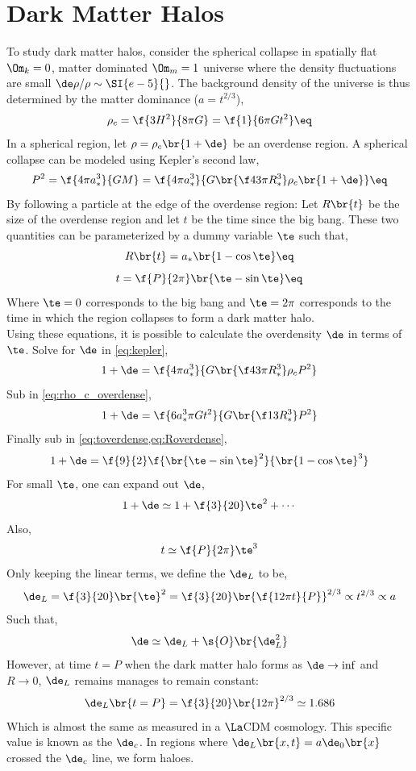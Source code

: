 \documentclass{article}
\begin{document}
\section{Dark Matter Halos}
To study dark matter halos, consider the spherical collapse in spatially flat $\Om_k = 0$, matter dominated $\Om_m = 1$ universe where the density fluctuations are small $\de \rho / \rho \sim \SI{e-5}{}$. The background density of the universe is thus determined by the matter dominance ($a = t^{2/3}$),
\[ \rho_c = \f{3 H^2}{8 \pi G} = \f{1}{6 \pi G t^2} \eq \label{eq:rho_c_overdense}\]
In a spherical region, let $\rho = \rho_c \br{1 + \de}$ be an overdense region. A spherical collapse can be modeled using Kepler's second law,
\[ P^2  = \f{4 \pi a_{*}^3}{GM} = \f{4 \pi a_{*}^3}{G \br{\f43 \pi R_{*}^3} \rho_{c}\br{1 + \de}} \eq \label{eq:kepler} \]
By following a particle at the edge of the overdense region: Let $R\br{t}$ be the size of the overdense region and let $t$ be the time since the big bang. These two quantities can be parameterized by a dummy variable $\te$ such that,
\[ R\br{t} = a_{*}\br{1  - \cos \te} \eq \label{eq:Roverdense}\]
\[ t = \f{P}{2 \pi}\br{\te - \sin \te} \eq \label{eq:toverdense}\]
Where $\te = 0$ corresponds to the big bang and $\te = 2\pi$ corresponds to the time in which the region collapses to form a dark matter halo.\\
Using these equations, it is possible to calculate the overdensity $\de$ in terms of $\te$. Solve for $\de$ in \cref{eq:kepler},
\[ 1 + \de = \f{4 \pi a_{*}^3}{G \br{\f43 \pi R_{*}^3} \rho_{c} P^2} \]
Sub in \cref{eq:rho_c_overdense},
\[ 1 + \de = \f{ 6 a_{*}^3 \pi G t^2}{G \br{\f13 R_{*}^3} P^2} \]
Finally sub in \cref{eq:toverdense,eq:Roverdense},
\[ 1 + \de = \f{9}{2}\f{\br{\te - \sin \te}^2}{\br{1 - \cos \te}^3} \]
For small $\te$, one can expand out $\de$,
\[ 1 + \de  \simeq 1 + \f{3}{20} \te^2 + \cdots \]
Also,
\[ t \simeq \f{P}{2 \pi} \te^3 \]
Only keeping the linear terms, we define the  $\de_L$ to be,
\[ \de_{L} = \f{3}{20} \br{\te}^2 = \f{3}{20} \br{\f{12 \pi t}{P}}^{2/3} \propto t^{2/3} \propto a \]
Such that,
\[ \de \simeq \de_{L} + \s{O}\br{\de_L^2} \]
However, at time $t = P$ when the dark matter halo forms as $\de \to \inf$ and $R \to 0$, $\de_L$ remains manages to remain constant:
\[ \de_L \br{t = P} = \f{3}{20} \br{12 \pi}^{2/3} \simeq 1.686 \]
Which is almost the same as measured in a $\La$CDM cosmology. This specific value is known as the  $\de_c$. In regions where $\de_{L}\br{x, t} = a \de_{0}\br{x}$ crossed the $\de_{c}$ line, we form haloes.\\
\end{document}
